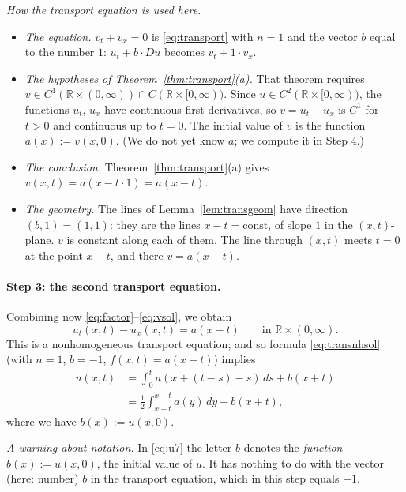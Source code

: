 \documentclass[11pt]{article}
\theoremstyle{plain}
\theoremstyle{definition}
\theoremstyle{remark}
\begin{document}
\emph{How the transport equation is used here.}
\begin{itemize}
    \item \emph{The equation.} $v_t + v_x = 0$ is \eqref{eq:transport} with $n = 1$ and the vector $b$ equal to the number $1$: $u_t + b\cdot Du$ becomes $v_t + 1\cdot v_x$.
    \item \emph{The hypotheses of Theorem~\ref{thm:transport}(a).} That theorem requires $v \in C^1(\mathbb{R} \times (0,\infty)) \cap C(\mathbb{R} \times [0,\infty))$. Since $u \in C^2(\mathbb{R}\times[0,\infty))$, the functions $u_t$, $u_x$ have continuous first derivatives, so $v = u_t - u_x$ is $C^1$ for $t > 0$ and continuous up to $t = 0$. The initial value of $v$ is the function $a(x) := v(x,0)$. (We do not yet know $a$; we compute it in Step 4.)
    \item \emph{The conclusion.} Theorem~\ref{thm:transport}(a) gives $v(x,t) = a(x - t\cdot 1) = a(x - t)$.
    \item \emph{The geometry.} The lines of Lemma~\ref{lem:transgeom} have direction $(b,1) = (1,1)$: they are the lines $x - t = \text{const}$, of slope $1$ in the $(x,t)$-plane. $v$ is constant along each of them. The line through $(x,t)$ meets $t = 0$ at the point $x - t$, and there $v = a(x - t)$.
\end{itemize}

\paragraph{Step 3: the second transport equation.} Combining now \eqref{eq:factor}--\eqref{eq:vsol}, we obtain
$$ u_t(x,t) - u_x(x,t) = a(x - t) \qquad \text{in } \mathbb{R} \times (0,\infty). $$
This is a nonhomogeneous transport equation; and so formula \eqref{eq:transnhsol} (with $n = 1$, $b = -1$, $f(x,t) = a(x - t)$) implies
\begin{equation}\label{eq:u7}
\begin{aligned}
u(x,t) &= \int_0^t a(x + (t - s) - s)\, ds + b(x + t) \\
&= \frac12\int_{x-t}^{x+t} a(y)\, dy + b(x + t),
\end{aligned}
\end{equation}
where we have $b(x) := u(x,0)$.

\emph{A warning about notation.} In \eqref{eq:u7} the letter $b$ denotes the \emph{function} $b(x) := u(x,0)$, the initial value of $u$. It has nothing to do with the vector (here: number) $b$ in the transport equation, which in this step equals $-1$.
\end{document}
